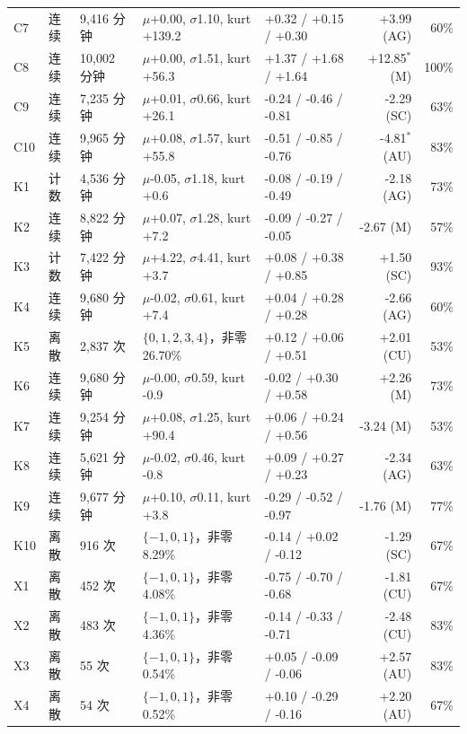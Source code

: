 \begin{tabular}{lllllrr}
C7 & 连续 & 9,416 分钟 & $\mu$+0.00, $\sigma$1.10, kurt +139.2 & +0.32 / +0.15 / +0.30 & +3.99 (AG) & 60\% \\
C8 & 连续 & 10,002 分钟 & $\mu$+0.00, $\sigma$1.51, kurt +56.3 & +1.37 / +1.68 / +1.64 & +12.85$^{\ast}$ (M) & 100\% \\
C9 & 连续 & 7,235 分钟 & $\mu$+0.01, $\sigma$0.66, kurt +26.1 & -0.24 / -0.46 / -0.81 & -2.29 (SC) & 63\% \\
C10 & 连续 & 9,965 分钟 & $\mu$+0.08, $\sigma$1.57, kurt +55.8 & -0.51 / -0.85 / -0.76 & -4.81$^{\ast}$ (AU) & 83\% \\
\addlinespace
K1 & 计数 & 4,536 分钟 & $\mu$-0.05, $\sigma$1.18, kurt +0.6 & -0.08 / -0.19 / -0.49 & -2.18 (AG) & 73\% \\
K2 & 连续 & 8,822 分钟 & $\mu$+0.07, $\sigma$1.28, kurt +7.2 & -0.09 / -0.27 / -0.05 & -2.67 (M) & 57\% \\
K3 & 计数 & 7,422 分钟 & $\mu$+4.22, $\sigma$4.41, kurt +3.7 & +0.08 / +0.38 / +0.85 & +1.50 (SC) & 93\% \\
K4 & 连续 & 9,680 分钟 & $\mu$-0.02, $\sigma$0.61, kurt +7.4 & +0.04 / +0.28 / +0.28 & -2.66 (AG) & 60\% \\
K5 & 离散 & 2,837 次 & $\{0,1,2,3,4\}$，非零 26.70\% & +0.12 / +0.06 / +0.51 & +2.01 (CU) & 53\% \\
K6 & 连续 & 9,680 分钟 & $\mu$-0.00, $\sigma$0.59, kurt -0.9 & -0.02 / +0.30 / +0.58 & +2.26 (M) & 73\% \\
K7 & 连续 & 9,254 分钟 & $\mu$+0.08, $\sigma$1.25, kurt +90.4 & +0.06 / +0.24 / +0.56 & -3.24 (M) & 53\% \\
K8 & 连续 & 5,621 分钟 & $\mu$-0.02, $\sigma$0.46, kurt -0.8 & +0.09 / +0.27 / +0.23 & -2.34 (AG) & 63\% \\
K9 & 连续 & 9,677 分钟 & $\mu$+0.10, $\sigma$0.11, kurt +3.8 & -0.29 / -0.52 / -0.97 & -1.76 (M) & 77\% \\
K10 & 离散 & 916 次 & $\{-1,0,1\}$，非零 8.29\% & -0.14 / +0.02 / -0.12 & -1.29 (SC) & 67\% \\
\addlinespace
X1 & 离散 & 452 次 & $\{-1,0,1\}$，非零 4.08\% & -0.75 / -0.70 / -0.68 & -1.81 (CU) & 67\% \\
X2 & 离散 & 483 次 & $\{-1,0,1\}$，非零 4.36\% & -0.14 / -0.33 / -0.71 & -2.48 (CU) & 83\% \\
X3 & 离散 & 55 次 & $\{-1,0,1\}$，非零 0.54\% & +0.05 / -0.09 / -0.06 & +2.57 (AU) & 83\% \\
X4 & 离散 & 54 次 & $\{-1,0,1\}$，非零 0.52\% & +0.10 / -0.29 / -0.16 & +2.20 (AU) & 67\% \\

\end{tabular}
